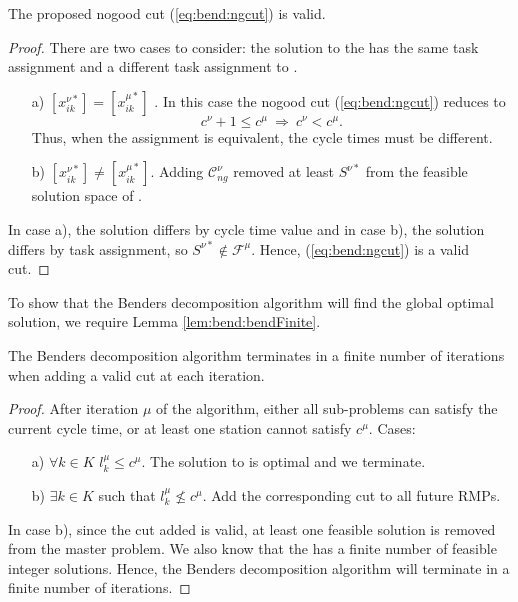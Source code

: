 \begin{theorem}\label{thm:bend:ngcut}
	The proposed nogood cut (\ref{eq:bend:ngcut}) is valid.
\end{theorem}
\begin{proof}
	There are two cases to consider: the solution to the \rmp{\mu}
	has the same task assignment and a different task assignment to
	\rmp{\nu}.
	\begin{itemize}
		\item[a)] $[x_{ik}^{\nu*}] = [x_{ik}^{\mu*}]$ .	
		In this case the nogood cut (\ref{eq:bend:ngcut}) reduces to
		\[ c^\nu +1 \leq c^\mu ~\Rightarrow ~c^\nu < c^\mu. \]
		Thus, when the assignment is equivalent, the cycle times
		must be different.
		\item[b)] $[x_{ik}^{\nu*}] \neq [x_{ik}^{\mu*}]$.
		Adding $\mathcal{C}_{ng}^\nu$ removed at least $S^{\nu*}$
		from the feasible solution space of \rmp{\mu}.
	\end{itemize}
	In case a), the solution differs by cycle time value and 
	in case b), the solution differs by task assignment, so
	$S^{\nu*}\not\in\mathcal{F^\mu}$.
	Hence, (\ref{eq:bend:ngcut}) is a valid cut.
\end{proof}

To show that the Benders decomposition algorithm
will find the global optimal solution, 
we require Lemma \ref{lem:bend:bendFinite}.

\begin{lemma}\label{lem:bend:bendFinite}
	The Benders decomposition algorithm
	terminates in a finite number of 
	iterations when adding a valid cut
	at each iteration.
\end{lemma}
\begin{proof}
	After iteration $\mu$ of the algorithm, either all sub-problems
	can satisfy the current cycle time,
	or at least one station cannot satisfy $c^\mu$.
	Cases:
	\begin{itemize}
		\item[a)] $\forall k\in K$  $l_k^\mu\leq c^\mu$.
		The solution to \rmp{\mu} is optimal and we terminate.
		\item[b)] $\exists k\in K$ such that $l_k^\mu\not\leq c^\mu$.
		Add the corresponding cut to all future RMPs.
	\end{itemize}
	In case b), since the cut added is valid,
	at least one feasible solution 
	is removed from the master problem.
	We also know that the \rmp{} has a finite number of feasible integer solutions.
	Hence, the Benders decomposition algorithm will terminate
	in a finite number of iterations.
\end{proof}

